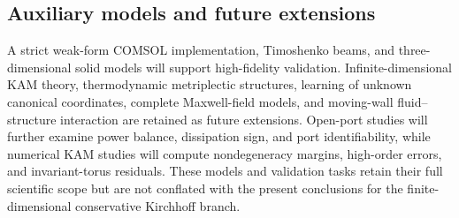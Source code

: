 \subsection{Auxiliary models and future extensions}\label{sec:discussion-7-3}

A strict weak-form COMSOL implementation, Timoshenko beams, and three-dimensional solid models will support high-fidelity validation. Infinite-dimensional KAM theory, thermodynamic metriplectic structures, learning of unknown canonical coordinates, complete Maxwell-field models, and moving-wall fluid--structure interaction are retained as future extensions. Open-port studies will further examine power balance, dissipation sign, and port identifiability, while numerical KAM studies will compute nondegeneracy margins, high-order errors, and invariant-torus residuals. These models and validation tasks retain their full scientific scope but are not conflated with the present conclusions for the finite-dimensional conservative Kirchhoff branch.\cite{COMSOLBeamInterface2025,COMSOLGeometricNonlinearity2025,COMSOLSectionStiffness2025,COMSOLWeakFormPDE2025,COMSOLWeakContribution2025,Jackson1998Electrodynamics,Abbott2020MagneticRobotics,Coquinot2020Metriplectic,Kuksin1993InfiniteDimensionalKAM}
